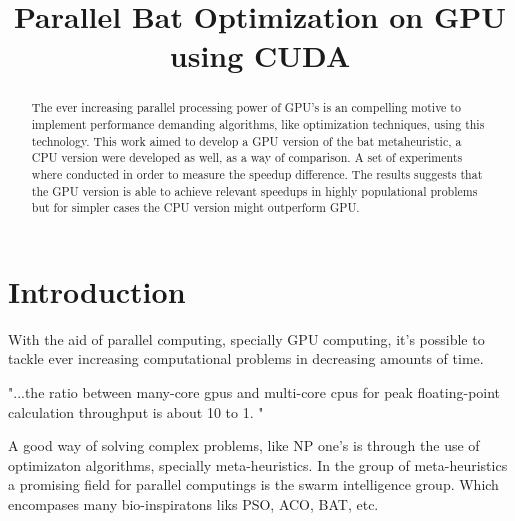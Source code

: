 \documentclass[conference]{IEEEtran}
\begin{document}
\title{Parallel Bat Optimization on GPU using CUDA}

\author{
\and
{}
}

\maketitle

\begin{abstract}
The ever increasing parallel processing power of GPU's is an compelling
motive to implement performance demanding algorithms, like optimization
techniques, using this technology. This work aimed to develop a GPU
version of the bat metaheuristic, a CPU version were developed as well,
as a way of comparison. A set of experiments where conducted in order
to measure the speedup difference. The results suggests that the GPU
version is able to achieve relevant speedups in highly populational
problems but for simpler cases the CPU version might outperform GPU.
\end{abstract}

\IEEEpeerreviewmaketitle

\section{Introduction}%

With the aid of parallel computing, specially GPU computing, it's
possible to tackle ever increasing computational problems in decreasing amounts of time.


"...the ratio between many-core gpus and multi-core cpus for peak
floating-point calculation throughput is about 10 to 1.  " \cite{programmingProcessors}

A good way of solving complex problems, like NP one's is through the use
of optimizaton algorithms, specially meta-heuristics. In the group of
meta-heuristics a promising field for parallel computings is the swarm
intelligence group. Which encompases many bio-inspiratons liks PSO, ACO,
BAT, etc.
\end{document}
